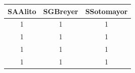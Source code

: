 \documentclass[12pt,twoside]{article}
\begin{document}
\begin{longtable}[c]{@{}ccc@{}}
\toprule
\begin{minipage}[b]{0.13\columnwidth}\centering\strut
SAAlito
\strut\end{minipage} &
\begin{minipage}[b]{0.14\columnwidth}\centering\strut
SGBreyer
\strut\end{minipage} &
\begin{minipage}[b]{0.15\columnwidth}\centering\strut
SSotomayor
\strut\end{minipage}\tabularnewline
\midrule
\endhead
\begin{minipage}[t]{0.13\columnwidth}\centering\strut
1
\strut\end{minipage} &
\begin{minipage}[t]{0.14\columnwidth}\centering\strut
1
\strut\end{minipage} &
\begin{minipage}[t]{0.15\columnwidth}\centering\strut
1
\strut\end{minipage}\tabularnewline
\begin{minipage}[t]{0.13\columnwidth}\centering\strut
1
\strut\end{minipage} &
\begin{minipage}[t]{0.14\columnwidth}\centering\strut
1
\strut\end{minipage} &
\begin{minipage}[t]{0.15\columnwidth}\centering\strut
1
\strut\end{minipage}\tabularnewline
\begin{minipage}[t]{0.13\columnwidth}\centering\strut
1
\strut\end{minipage} &
\begin{minipage}[t]{0.14\columnwidth}\centering\strut
1
\strut\end{minipage} &
\begin{minipage}[t]{0.15\columnwidth}\centering\strut
1
\strut\end{minipage}\tabularnewline
\begin{minipage}[t]{0.13\columnwidth}\centering\strut
1
\strut\end{minipage} &
\begin{minipage}[t]{0.14\columnwidth}\centering\strut
1
\strut\end{minipage} &
\begin{minipage}[t]{0.15\columnwidth}\centering\strut
1
\strut\end{minipage}\tabularnewline
\bottomrule
\end{longtable}
\end{document}
